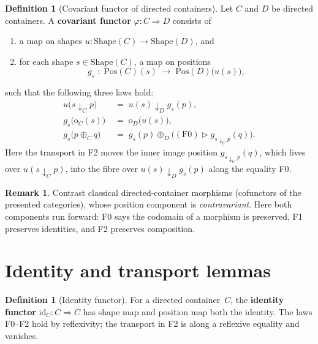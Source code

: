 \documentclass[11pt,a4paper]{article}
\theoremstyle{plain}
\theoremstyle{definition}
\newtheorem{definition}[theorem]{Definition}
\newtheorem{remark}[theorem]{Remark}
\newcommand{\Shape}{\mathrm{Shape}}
\newcommand{\Pos}{\mathrm{Pos}}
\newcommand{\id}{\mathrm{id}}
\newcommand{\rootp}{\mathrm{o}}
\begin{document}
\begin{definition}[Covariant functor of directed containers]\label{def:dcont-functor}
Let $C$ and $D$ be directed containers. A \textbf{covariant functor}
$\varphi : C \Rightarrow D$ consists of
\begin{enumerate}
  \item a map on shapes $u : \Shape(C) \to \Shape(D)$, and
  \item for each shape $s \in \Shape(C)$, a map on positions
        \[
          g_s \;:\; \Pos(C)(s) \;\longrightarrow\; \Pos(D)\bigl(u(s)\bigr),
        \]
\end{enumerate}
such that the following three laws hold:
\begin{align}
  \tag{F0}
  u\bigl(s \downarrow_C p\bigr)
  &\;=\;
  u(s) \downarrow_D g_s(p),
  \\[4pt]
  \tag{F1}
  g_s\bigl(\rootp_C(s)\bigr)
  &\;=\;
  \rootp_D\bigl(u(s)\bigr),
  \\[4pt]
  \tag{F2}
  g_s\bigl(p \oplus_C q\bigr)
  &\;=\;
  g_s(p) \oplus_D
    \bigl(
      (\mathrm{F0}) \mathbin{\triangleright}
      g_{s \downarrow_C p}(q)
    \bigr).
\end{align}
Here the transport in F2 moves the inner image position
$g_{s \downarrow_C p}(q)$, which lives over $u(s \downarrow_C p)$, into the
fibre over $u(s) \downarrow_D g_s(p)$ along the equality F0.
\end{definition}

\begin{remark}
Contrast classical directed-container morphisms (cofunctors of the presented
categories), whose position component is \emph{contravariant}. Here both
components run forward: F0 says the codomain of a morphism is preserved, F1
preserves identities, and F2 preserves composition.
\end{remark}

\section{Identity and transport lemmas}

\begin{definition}[Identity functor]\label{def:id}
For a directed container~$C$, the \textbf{identity functor}
$\id_C : C \Rightarrow C$ has shape map and position map both the identity.
The laws F0--F2 hold by reflexivity; the transport in F2 is along a
reflexive equality and vanishes.
\end{definition}
\end{document}
